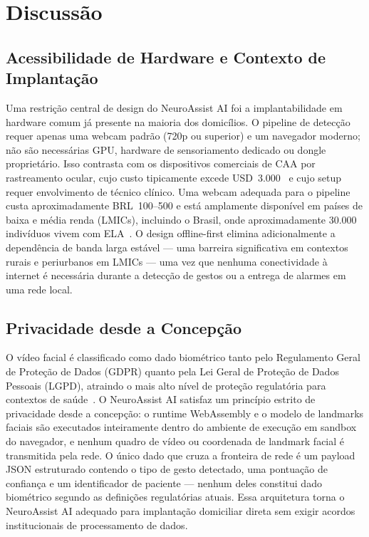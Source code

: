 
\section{Discussão}
\label{sec:discussao}

\subsection{Acessibilidade de Hardware e Contexto de Implantação}

Uma restrição central de design do NeuroAssist AI foi a implantabilidade em hardware
comum já presente na maioria dos domicílios. O pipeline de detecção requer apenas
uma webcam padrão (720p ou superior) e um navegador moderno; não são necessárias GPU,
hardware de sensoriamento dedicado ou dongle proprietário. Isso contrasta com os
dispositivos comerciais de CAA por rastreamento ocular, cujo custo tipicamente excede
USD~3.000~\cite{beukelman2013aac} e cujo setup requer envolvimento de técnico clínico.
Uma webcam adequada para o pipeline custa aproximadamente BRL~100--500 e está
amplamente disponível em países de baixa e média renda (LMICs), incluindo o Brasil,
onde aproximadamente 30.000 indivíduos vivem com ELA~\cite{mehta2018mnd}. O design
offline-first elimina adicionalmente a dependência de banda larga estável — uma
barreira significativa em contextos rurais e periurbanos em LMICs — uma vez que
nenhuma conectividade à internet é necessária durante a detecção de gestos ou a
entrega de alarmes em uma rede local.

\subsection{Privacidade desde a Concepção}

O vídeo facial é classificado como dado biométrico tanto pelo Regulamento Geral de
Proteção de Dados (GDPR) quanto pela Lei Geral de Proteção de Dados Pessoais (LGPD),
atraindo o mais alto nível de proteção regulatória para contextos de
saúde~\cite{edpb2020privacy}. O NeuroAssist AI satisfaz um princípio estrito de
privacidade desde a concepção: o runtime WebAssembly e o modelo de landmarks faciais
são executados inteiramente dentro do ambiente de execução em sandbox do navegador, e
nenhum quadro de vídeo ou coordenada de landmark facial é transmitida pela rede. O
único dado que cruza a fronteira de rede é um payload JSON estruturado contendo o tipo
de gesto detectado, uma pontuação de confiança e um identificador de paciente — nenhum
deles constitui dado biométrico segundo as definições regulatórias atuais. Essa
arquitetura torna o NeuroAssist AI adequado para implantação domiciliar direta sem
exigir acordos institucionais de processamento de dados.

